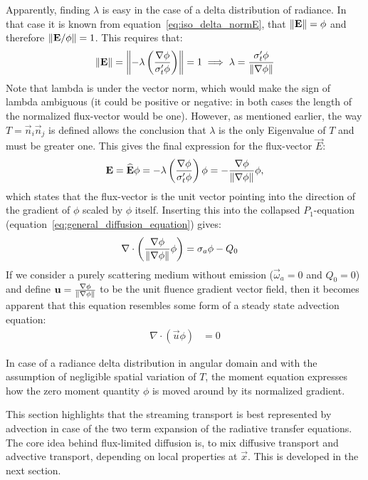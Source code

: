 Apparently, finding $\lambda$ is easy in the case of a delta distribution of radiance. In that case it is known from equation~\ref{eq:iso_delta_normE}, that $\left\lVert\boldsymbol{\mathbf{E}}\right\rVert=\phi$ and therefore $\left\lVert\boldsymbol{\mathbf{E}}/\phi\right\rVert=1$. This requires that:
\begin{align*}
\left\lVert\boldsymbol{\mathbf{E}}\right\rVert
=
\left\lVert-\lambda\left(\frac{\nabla\phi}{\sigma_t'\phi}\right )\right\rVert=1
\implies
\lambda=\frac{\sigma_t'\phi}{\left\lVert\nabla\phi\right\rVert}
\end{align*}
Note that lambda is under the vector norm, which would make the sign of lambda ambiguous (it could be positive or negative: in both cases the length of the normalized flux-vector would be one). However, as mentioned earlier, the way $T=\vec{n}_i\vec{n}_j$ is defined allows the conclusion that $\lambda$ is the only Eigenvalue of $T$ and must be greater one. This gives the final expression for the flux-vector $\vec{E}$:
\begin{align*}
\boldsymbol{\mathbf{E}}=\widehat{\boldsymbol{\mathbf{E}}}\phi= -\lambda\left(\frac{\nabla\phi}{\sigma_t'\phi}\right )\phi= -\frac{\nabla\phi}{\left\lVert\nabla\phi\right\rVert}\phi
,
\end{align*}
which states that the flux-vector is the unit vector pointing into the direction of the gradient of $\phi$ scaled by $\phi$ itself. Inserting this into the collapsed $P_1$-equation (equation~\ref{eq:general_diffusion_equation}) gives:
\begin{align}
\label{eq:iso_delta_advection_equation}
\nabla\cdot\left(\frac{\nabla\phi}{\left\lVert\nabla\phi\right\rVert}\phi\right) &= \sigma_a\phi - Q_0
\end{align}
If we consider a purely scattering medium without emission ($\vec{\omega}_a=0$ and $Q_0=0$) and define $\boldsymbol{\mathbf{u}}=\frac{\nabla\phi}{\left\lVert\nabla\phi\right\rVert}$ to be the unit fluence gradient vector field, then it becomes apparent that this equation resembles some form of a steady state advection equation:
\begin{align}
\label{eq:iso_delta_advection_equation2}
\nabla\cdot\left(\vec{u}\phi\right) &= 0
\end{align}

In case of a radiance delta distribution in angular domain and with the assumption of negligible spatial variation of $T$, the moment equation expresses how the zero moment quantity $\phi$ is moved around by its normalized gradient.

This section highlights that the streaming transport is best represented by advection in case of the two term expansion of the radiative transfer equations. The core idea behind flux-limited diffusion is, to mix diffusive transport and advective transport, depending on local properties at $\vec{x}$. This is developed in the next section.